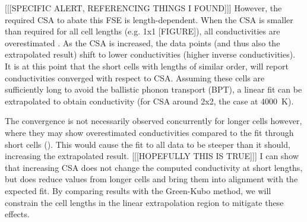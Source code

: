[[[SPECIFIC ALERT, REFERENCING THINGS I FOUND]]] However, the required CSA to abate this FSE is length-dependent. When the CSA is smaller than required for all cell lengths (e.g. 1x1 [FIGURE]), all conductivities are overestimated \citep[][albeit for nanotube diameter?]{Thomas2010}. As the CSA is increased, the data points (and thus also the extrapolated result) shift to lower conductivities (higher inverse conductivities). It is at this point that the short cells with lengths of similar order, will report conductivities converged with respect to CSA. Assuming these cells are sufficiently long to avoid the ballistic phonon transport (BPT), a linear fit can be extrapolated to obtain conductivity (for CSA around 2x2, the case at 4000~K). 

The convergence is not necessarily observed concurrently for longer cells however, where they may show overestimated conductivities compared to the fit through short cells (\cite{Hu2011}). This would cause the fit to all data to be steeper than it should, increasing the extrapolated result.  [[[HOPEFULLY THIS IS TRUE]]] I can show that increasing CSA does not change the computed conductivity at short lengths, but does reduce values from longer cells and bring them into alignment with the expected fit. By comparing results with the Green-Kubo method, we will constrain the cell lengths in the linear extrapolation region to mitigate these effects.















